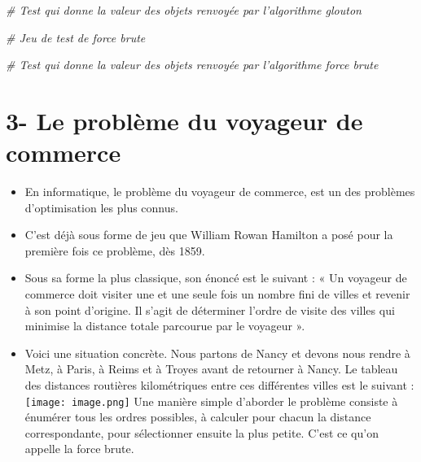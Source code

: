 \documentclass[
  paper=a4,
  ,captions=tableheading
]{scrartcl}
\newenvironment{Shaded}{}{}
\newcommand{\CommentTok}[1]{\textcolor[rgb]{0.38,0.63,0.69}{\textit{#1}}}
\providecommand{\tightlist}{%
  \setlength{\itemsep}{0pt}\setlength{\parskip}{0pt}}
\begin{document}
\begin{Shaded}
\begin{Highlighting}[]
\CommentTok{\# Test qui donne la valeur des objets renvoyée par l’algorithme glouton}
\end{Highlighting}
\end{Shaded}

\begin{Shaded}
\begin{Highlighting}[]
\CommentTok{\# Jeu de test de force brute}
\end{Highlighting}
\end{Shaded}

\begin{Shaded}
\begin{Highlighting}[]
\CommentTok{\# Test qui donne la valeur des objets renvoyée par l’algorithme force brute}
\end{Highlighting}
\end{Shaded}

\hypertarget{3--le-probluxe8me-du-voyageur-de-commerce}{%
\section{3- Le problème du voyageur de
commerce}\label{3--le-probluxe8me-du-voyageur-de-commerce}}

\begin{itemize}
\tightlist
\item
  En informatique, le problème du voyageur de commerce, est un des
  problèmes d'optimisation les plus connus.
\item
  C'est déjà sous forme de jeu que William Rowan Hamilton a posé pour la
  première fois ce problème, dès 1859.
\item
  Sous sa forme la plus classique, son énoncé est le suivant : « Un
  voyageur de commerce doit visiter une et une seule fois un nombre fini
  de villes et revenir à son point d'origine. Il s'agit de déterminer
  l'ordre de visite des villes qui minimise la distance totale parcourue
  par le voyageur ».
\item
  Voici une situation concrète. Nous partons de Nancy et devons nous
  rendre à Metz, à Paris, à Reims et à Troyes avant de retourner à
  Nancy. Le tableau des distances routières kilométriques entre ces
  différentes villes est le suivant : \texttt{[image: image.png]} Une
  manière simple d'aborder le problème consiste à énumérer tous les
  ordres possibles, à calculer pour chacun la distance correspondante,
  pour sélectionner ensuite la plus petite. C'est ce qu'on appelle la
  force brute.
\end{itemize}
\end{document}
